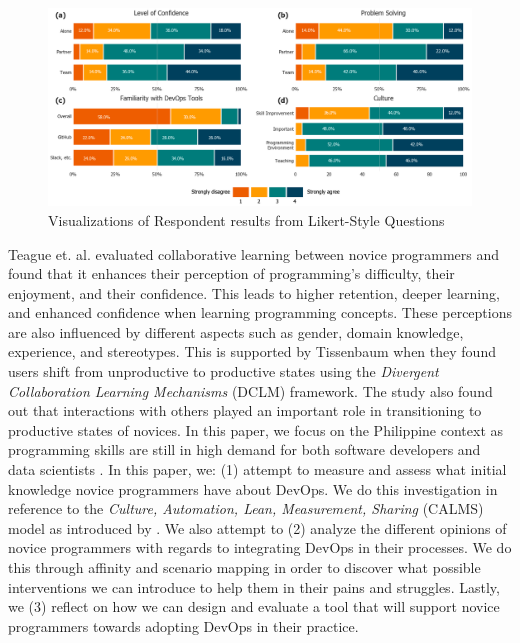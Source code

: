 \documentclass{sigchi}
\begin{document}
\begin{figure}[tp]
\centering
 \includegraphics[width=1.9\columnwidth]{figures/Figure_Combined.png}
    \caption{Visualizations of Respondent results from Likert-Style Questions}\label{fig:likerts}
\end{figure}

Teague et. al. \cite{teague2008collaborative} evaluated collaborative learning between novice programmers and found that it enhances their perception of programming's difficulty, their enjoyment, and their confidence. This leads to higher retention, deeper learning, and enhanced confidence when learning programming concepts. These perceptions are also influenced by different aspects such as gender, domain knowledge, experience, and stereotypes. This is supported by Tissenbaum \cite{tissenbaum2020see} when they found users shift from unproductive to productive states using the \textit{Divergent Collaboration Learning Mechanisms} (DCLM) framework. The study also found out that interactions with others played an important role in transitioning to productive states of novices. In this paper, we focus on the Philippine context as programming skills are still in high demand for both software developers and data scientists \cite{gonzales_2019, quismorio_pasquin_tayco_2020}. In this paper, we: (1) attempt to measure and assess what initial knowledge novice programmers have about DevOps. We do this investigation in reference to the \textit{Culture, Automation, Lean, Measurement, Sharing} (CALMS) model as introduced by \cite{hamunen2016challenges, riley2014keep}. We also attempt to (2) analyze the different opinions of novice programmers with regards to integrating DevOps in their processes. We do this through affinity and scenario mapping in order to discover what possible interventions we can introduce to help them in their pains and struggles. Lastly, we (3) reflect on how we can design and evaluate a tool that will support novice programmers towards adopting DevOps in their practice.
\end{document}
